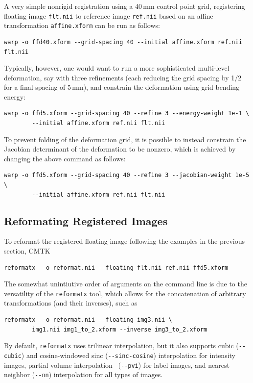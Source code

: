 \documentclass{InsightArticle}
\begin{document}
A very simple nonrigid registration using a 40\,mm control point grid,
registering floating image \verb|flt.nii| to reference image \verb|ref.nii|
based on an affine transformation \verb|affine.xform| can be run as follows:
\begin{verbatim}
warp -o ffd40.xform --grid-spacing 40 --initial affine.xform ref.nii flt.nii
\end{verbatim}
Typically, however, one would want to run a more sophisticated multi-level
deformation, say with three refinements (each reducing the grid spacing by
1/2 for a final spacing of 5\,mm), and constrain the deformation using grid
bending energy:
\begin{verbatim}
warp -o ffd5.xform --grid-spacing 40 --refine 3 --energy-weight 1e-1 \
        --initial affine.xform ref.nii flt.nii
\end{verbatim}
To prevent folding of the deformation grid, it is possible to instead
constrain the Jacobian determinant of the deformation to be nonzero, which is
achieved by changing the above command as follows:
\begin{verbatim}
warp -o ffd5.xform --grid-spacing 40 --refine 3 --jacobian-weight 1e-5 \
        --initial affine.xform ref.nii flt.nii
\end{verbatim}

\subsection{Reformating Registered Images}

To reformat the registered floating image following the examples in
the previous section, CMTK
\begin{verbatim}
reformatx  -o reformat.nii --floating flt.nii ref.nii ffd5.xform
\end{verbatim}
The somewhat unintiutive order of arguments on the command line is due to the
versatility of the \verb|reformatx| tool, which allows for the concatenation
of arbitrary transformations (and their inverses), such as
\begin{verbatim}
reformatx  -o reformat.nii --floating img3.nii \
        img1.nii img1_to_2.xform --inverse img3_to_2.xform
\end{verbatim} 
By default, \verb|reformatx| uses trilinear interpolation, but it also
supports cubic (\verb|--cubic|) and cosine-windowed sinc
(\verb|--sinc-cosine|) interpolation for intensity images, partial volume
interpolation~\cite{MaesCollVand:1997} (\verb|--pvi|) for label images, and
nearest neighbor (\verb|--nn|) interpolation for all types of images.
\end{document}
